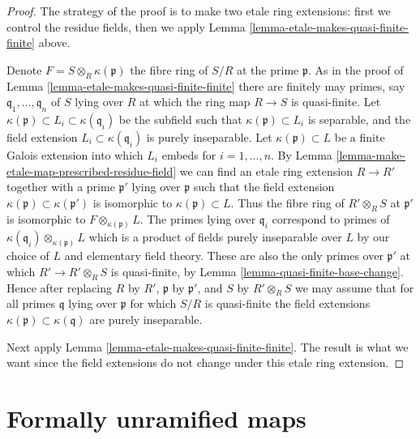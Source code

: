 \begin{proof}
The strategy of the proof is to make two etale ring
extensions: first we control the residue fields, then we
apply Lemma \ref{lemma-etale-makes-quasi-finite-finite} above.

\medskip\noindent
Denote $F = S \otimes_R \kappa(\mathfrak p)$ the fibre ring of $S/R$
at the prime $\mathfrak p$.
As in the proof of Lemma \ref{lemma-etale-makes-quasi-finite-finite}
there are finitely may primes, say
$\mathfrak q_1, \ldots, \mathfrak q_n$ of $S$ lying over
$R$ at which the ring map $R \to S$ is quasi-finite.
Let $\kappa(\mathfrak p) \subset L_i \subset \kappa(\mathfrak q_i)$
be the subfield such that $\kappa(\mathfrak p) \subset L_i$
is separable, and the field extension $L_i \subset \kappa(\mathfrak q_i)$
is purely inseparable. Let $\kappa(\mathfrak p) \subset L$
be a finite Galois extension into which $L_i$ embeds for $i = 1, \ldots, n$.
By Lemma \ref{lemma-make-etale-map-prescribed-residue-field}
we can find an etale ring extension
$R \to R'$ together with a prime $\mathfrak p'$ lying over $\mathfrak p$
such that the field extension
$\kappa(\mathfrak p) \subset \kappa(\mathfrak p')$ is isomorphic
to $\kappa(\mathfrak p) \subset L$.
Thus the fibre ring of $R' \otimes_R S$ at $\mathfrak p'$ is
isomorphic to $F \otimes_{\kappa(\mathfrak p)} L$.
The primes lying over $\mathfrak q_i$ correspond to primes
of $\kappa(\mathfrak q_i) \otimes_{\kappa(\mathfrak p)} L$
which is a product of fields purely inseparable over
$L$ by our choice of $L$ and elementary field theory.
These are also the only primes over $\mathfrak p'$
at which $R' \to R' \otimes_R S$ is quasi-finite, by
Lemma \ref{lemma-quasi-finite-base-change}.
Hence after replacing $R$ by $R'$, $\mathfrak p$ by $\mathfrak p'$,
and $S$ by $R' \otimes_R S$ we may assume that for all
primes $\mathfrak q$ lying over $\mathfrak p$
for which $S/R$ is quasi-finite the field extensions
$\kappa(\mathfrak p) \subset \kappa(\mathfrak q)$
are purely inseparable.

\medskip\noindent
Next apply Lemma \ref{lemma-etale-makes-quasi-finite-finite}.
The result is what we want since the field extensions do not
change under this etale ring extension.
\end{proof}







\section{Formally unramified maps}
\label{section-formally-unramified}

